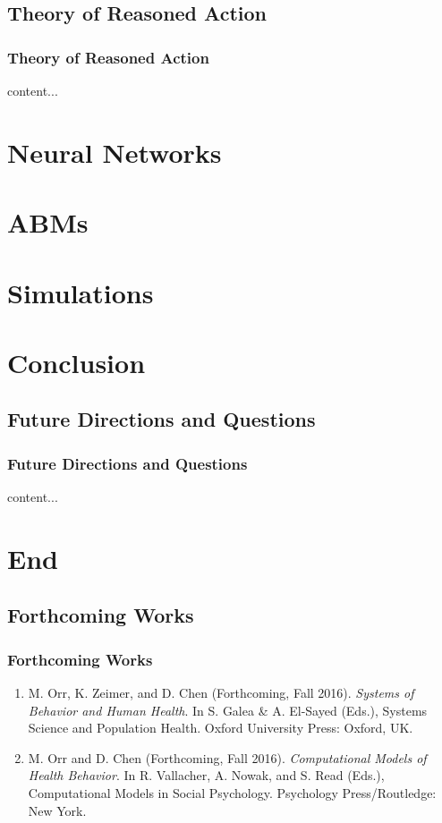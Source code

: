 \documentclass[compress]{beamer}
\begin{document}
\subsection{Theory of Reasoned Action}

\begin{frame}[Basic2]\frametitle{Theory of Reasoned Action}
    content...
\end{frame}

\section{Neural Networks}

\section{ABMs}

\section{Simulations}

\section{Conclusion}

\subsection{Future Directions and Questions}

    \begin{frame}[Basic2]\frametitle{Future Directions and Questions}
        content...
    \end{frame}

\section{End}

\subsection{Forthcoming Works}
    \begin{frame}[Basic2] \frametitle{Forthcoming Works}
        \begin{enumerate}
            \item M. Orr, K. Zeimer, and D. Chen (Forthcoming, Fall 2016).
            \textit{Systems of Behavior and Human Health}. In S. Galea \& A. El-Sayed (Eds.),
            Systems Science and Population Health. Oxford University Press: Oxford, UK.

            \item M. Orr and D. Chen (Forthcoming, Fall 2016).
            \textit{Computational Models of Health Behavior}.
            In R. Vallacher, A. Nowak, and S. Read (Eds.),
            Computational Models in Social Psychology. Psychology Press/Routledge: New York.
        \end{enumerate}
    \end{frame}
\end{document}
